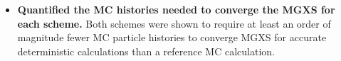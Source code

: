 \begin{itemize}
\item \textbf{Quantified the MC histories needed to converge the MGXS for each scheme.} Both schemes were shown to require at least an order of magnitude fewer MC particle histories to converge MGXS for accurate deterministic calculations than a reference MC calculation. 


\end{itemize}




